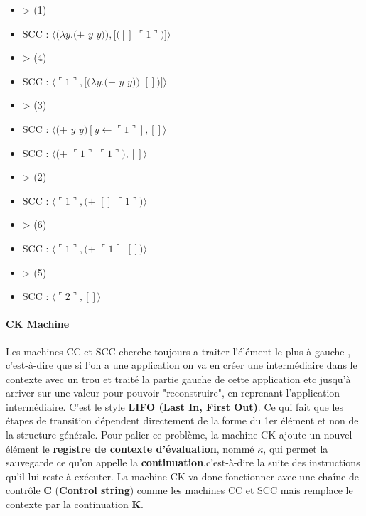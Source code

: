 \documentclass[10pt,a4paper]{article}
\begin{document}
\begin{multicols}{2}
{							\begin{itemize}
								\item[] > (1) 
								\item[] SCC : $\langle(\lambda y.(+$ $y$ $y)),[([]$ $\ulcorner 1\urcorner)]\rangle$
								\item[] > (4)
								\item[] SCC : $\langle\ulcorner 1\urcorner,[(\lambda y.(+$ $y$ $y))$ $[])]\rangle$
								\item[] > (3) 
								\item[] SCC : $\langle(+$ $y$ $y)[y \leftarrow \ulcorner 1\urcorner],[]\rangle$	
								\item[] SCC : $\langle(+$ $\ulcorner 1\urcorner$ $\ulcorner 1\urcorner),[]\rangle$	
								\item[] > (2) 
								\item[] SCC : $\langle\ulcorner 1\urcorner,(+$ $[]$ $\ulcorner 1\urcorner)\rangle$	
								\item[] > (6) 
								\item[] SCC : $\langle\ulcorner 1\urcorner,(+$ $\ulcorner 1\urcorner$ $[])\rangle$	
								\item[] > (5)
								\item[] SCC : $\langle\ulcorner 2\urcorner,[]\rangle$	
							\end{itemize}
						}
					\end{multicols}
					\newpage
			
			
			
			\paragraph{CK Machine}
			
				Les machines CC et SCC cherche toujours a traiter l'élément le plus à gauche , c'est-à-dire que si l'on a une application on va en créer une intermédiaire dans le contexte avec un trou et traité la partie gauche de cette application etc jusqu'à arriver sur une valeur pour pouvoir "reconstruire", en reprenant l'application intermédiaire. C'est le style \textbf{ LIFO (Last In, First Out)}. Ce qui fait que les étapes de transition dépendent directement de la forme du 1er élément et non de la structure générale.
				\smallbreak
				Pour palier ce problème, la machine CK ajoute un nouvel élément le \textbf{registre de contexte d'évaluation}, nommé $\kappa$, qui permet la sauvegarde ce qu'on appelle la \textbf{continuation},c'est-à-dire la suite des instructions qu'il lui reste à exécuter.
				\smallbreak
				La machine CK va donc fonctionner avec une chaîne de contrôle \textbf{C} (\textbf{Control string}) comme les machines CC et SCC mais remplace le contexte par la continuation \textbf{K}. 
				\medbreak
				
\end{document}
